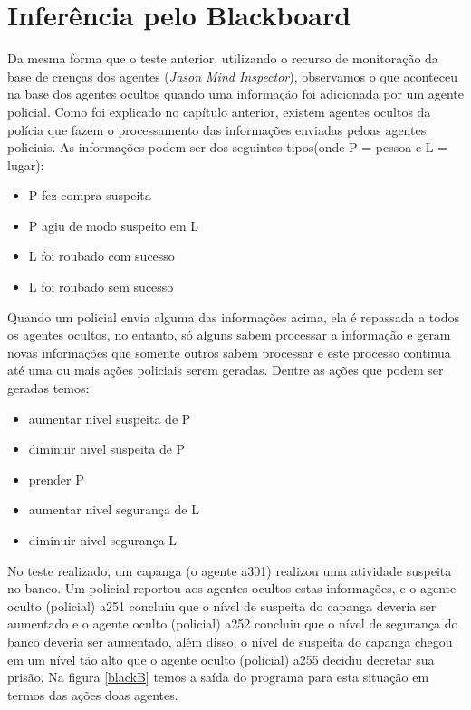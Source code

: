 \section{Inferência pelo Blackboard}
Da mesma forma que o teste anterior, utilizando o recurso de monitoração da base de crenças dos agentes (\emph{Jason Mind Inspector}), observamos o que aconteceu na base dos agentes ocultos quando uma informação foi adicionada por um agente policial.
Como foi explicado no capítulo anterior, existem agentes ocultos da polícia que fazem o processamento das informações enviadas peloas agentes policiais. As informações podem ser dos seguintes tipos(onde P = pessoa e L = lugar):
\begin{itemize}
\item P fez compra suspeita
\item P agiu de modo suspeito em L
\item L foi roubado com sucesso
\item L foi roubado sem sucesso
\end{itemize}
Quando um policial envia alguma das informações acima, ela é repassada a todos os agentes ocultos, no entanto, só alguns sabem processar a informação e geram novas informações que somente outros sabem processar e este processo continua até uma ou mais ações policiais serem geradas.
Dentre as ações que podem ser geradas temos:
\begin{itemize}
\item aumentar nivel suspeita de P
\item diminuir nivel suspeita de P
\item prender P
\item aumentar nivel segurança de L
\item diminuir nivel segurança L 
\end{itemize}
No teste realizado, um capanga (o agente a301) realizou uma atividade suspeita no banco. Um policial reportou aos agentes ocultos estas informações, e o agente oculto (policial) a251 concluiu que o nível de suspeita do capanga deveria ser aumentado e o agente oculto (policial) a252 concluiu que o nível de segurança do banco deveria ser aumentado, além disso, o nível de suspeita do capanga chegou em um nível tão alto que o agente oculto (policial) a255 decidiu decretar sua prisão.
Na figura \ref{blackB} temos a saída do programa para esta situação em termos das ações doas agentes.


